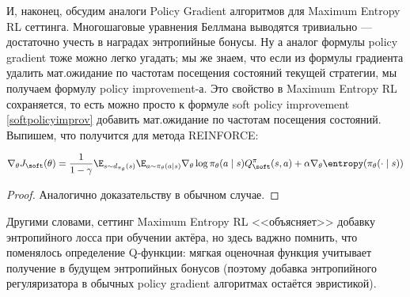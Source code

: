 И, наконец, обсудим аналоги Policy Gradient алгоритмов для Maximum Entropy RL сеттинга. Многошаговые уравнения Беллмана выводятся тривиально --- достаточно учесть в наградах энтропийные бонусы. Ну а аналог формулы policy gradient тоже можно легко угадать; мы же знаем, что если из формулы градиента удалить мат.ожидание по частотам посещения состояний текущей стратегии, мы получаем формулу policy improvement-а. Это свойство в Maximum Entropy RL сохраняется, то есть можно просто к формуле soft policy improvement \eqref{softpolicyimprov} добавить мат.ожидание по частотам посещения состояний. Выпишем, что получится для метода REINFORCE:

\begin{theorem}
$$\nabla_{\theta} J_{\soft}(\theta) = \frac{1}{1 - \gamma} \E_{s \sim d_{\pi_\theta}(s)} \E_{a \sim \pi_\theta(a \mid s)} \nabla_\theta \log \pi_\theta(a \mid s) Q^{\pi}_{\soft}(s, a) + \alpha \nabla_\theta \entropy(\pi_\theta(\cdot \mid s))$$
\begin{proof}
Аналогично доказательству в обычном случае.
\end{proof}
\end{theorem}

Другими словами, сеттинг Maximum Entropy RL <<объясняет>> добавку энтропийного лосса при обучении актёра, но здесь ваджно помнить, что поменялось определение Q-функции: мягкая оценочная функция учитывает получение в будущем энтропийных бонусов (поэтому добавка энтропийного регуляризатора в обычных policy gradient алгоритмах остаётся эвристикой). 




